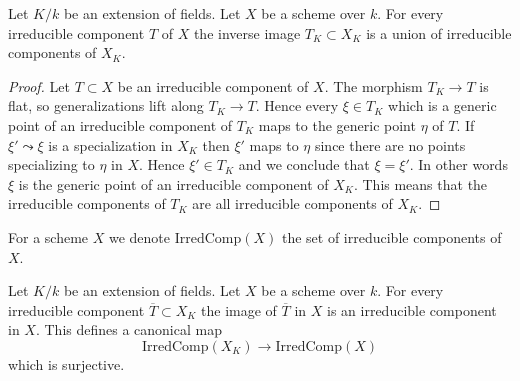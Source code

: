 \begin{lemma}
\label{lemma-inverse-image-irreducible}
Let $K/k$ be an extension of fields.
Let $X$ be a scheme over $k$.
For every irreducible component $T$ of $X$ the inverse image
$T_K \subset X_K$ is a union of irreducible components of $X_K$.
\end{lemma}

\begin{proof}
Let $T \subset X$ be an irreducible component of $X$.
The morphism $T_K \to T$ is flat, so generalizations lift
along $T_K \to T$. Hence every $\xi \in T_K$
which is a generic point of an irreducible component of $T_K$
maps to the generic point $\eta$ of $T$. If $\xi' \leadsto \xi$ is
a specialization in $X_K$ then $\xi'$ maps to $\eta$ since there
are no points specializing to $\eta$ in $X$. Hence $\xi' \in T_K$
and we conclude that $\xi = \xi'$. In other words $\xi$ is the
generic point of an irreducible component of $X_K$. This
means that the irreducible components of $T_K$ are all irreducible
components of $X_K$.
\end{proof}

\noindent
For a scheme $X$ we denote $\text{IrredComp}(X)$ the set of
irreducible components of $X$.

\begin{lemma}
\label{lemma-image-irreducible}
Let $K/k$ be an extension of fields.
Let $X$ be a scheme over $k$.
For every irreducible component $\overline{T} \subset X_K$
the image of $\overline{T}$ in $X$ is an irreducible component in $X$.
This defines a canonical map
$$
\text{IrredComp}(X_K)
\longrightarrow
\text{IrredComp}(X)
$$
which is surjective.
\end{lemma}

